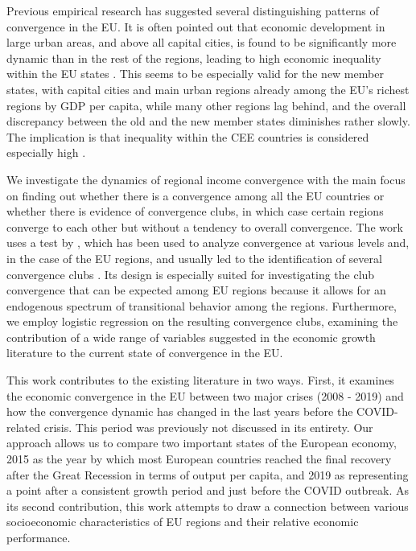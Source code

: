 \documentclass[11pt]{article}
\begin{document}
Previous empirical research has suggested several distinguishing patterns of convergence in the EU. It is often pointed out that economic development in large urban areas, and above all capital cities, is found to be significantly more dynamic than in the rest of the regions, leading to high economic inequality within the EU states \citep{geppert2008regional}. This seems to be especially valid for the new member states, with capital cities and main urban regions already among the EU's richest regions by GDP per capita, while many other regions lag behind, and the overall discrepancy between the old and the new member states diminishes rather slowly. The implication is that inequality within the CEE countries is considered especially high \citep{geppert2008regional,sme2012regional, smketkowski2013regional}.


We investigate the dynamics of regional income convergence with the main focus on finding out whether there is a convergence among all the EU countries or whether there is evidence of convergence clubs, in which case certain regions converge to each other but without a tendency to overall convergence. The work uses a test by \citet{phillips2007transition}, which has been used to analyze convergence at various levels and, in the case of the EU regions, and usually led to the identification of several convergence clubs \citep{bartkowska2012regional, borsi2015evolution, von2017regional}. Its design is especially suited for investigating the club convergence that can be expected among EU regions because it allows for an endogenous spectrum of transitional behavior among the regions. Furthermore, we employ logistic regression on the resulting convergence clubs, examining the contribution of a wide range of variables suggested in the economic growth literature to the current state of convergence in the EU.

This work contributes to the existing literature in two ways. First, it examines the economic convergence in the EU between two major crises (2008 - 2019) and how the convergence dynamic has changed in the last years before the COVID-related crisis. This period was previously not discussed in its entirety. Our approach allows us to compare two important states of the European economy, 2015 as the year by which most European countries reached the final recovery after the Great Recession in terms of output per capita, and 2019 as representing a point after a consistent growth period and just before the COVID outbreak. As its second contribution, this work attempts to draw a connection between various socioeconomic characteristics of EU regions and their relative economic performance.
\end{document}
